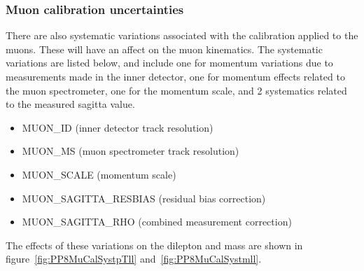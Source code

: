{\subsubsection{Muon calibration uncertainties}
There are also systematic variations associated with the calibration applied to the muons. These will have an affect on the muon kinematics. The systematic variations are listed below, and include
one for momentum variations due to measurements made in the inner detector, one for momentum effects related to the muon spectrometer, one for the momentum scale, and 2 systematics related to the measured sagitta value.
\begin{itemize}
  \setlength{\itemsep}{1pt}\setlength{\parskip}{0pt}\setlength{\parsep}{0pt}
  \item MUON\_ID (inner detector track resolution)
  \item MUON\_MS (muon spectrometer track resolution)
  \item MUON\_SCALE (momentum scale)
  \item MUON\_SAGITTA\_RESBIAS (residual bias correction)
  \item MUON\_SAGITTA\_RHO (combined measurement correction)
\end{itemize}

The effects of these variations on the dilepton \pt and mass are shown in figure~\ref{fig:PP8MuCalSystpTll} and~\ref{fig:PP8MuCalSystmll}.

}
